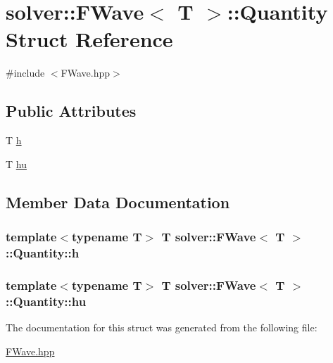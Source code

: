 \hypertarget{structsolver_1_1FWave_1_1Quantity}{}\section{solver\+:\+:F\+Wave$<$ T $>$\+:\+:Quantity Struct Reference}
\label{structsolver_1_1FWave_1_1Quantity}


{\ttfamily \#include $<$F\+Wave.\+hpp$>$}

\subsection*{Public Attributes}
\begin{DoxyCompactItemize}
\item 
T \hyperlink{structsolver_1_1FWave_1_1Quantity_ab21e966b42ed55a04b852deb96ec7285}{h}
\item 
T \hyperlink{structsolver_1_1FWave_1_1Quantity_a85b3d7be51ca5dc26a031d421c16095c}{hu}
\end{DoxyCompactItemize}


\subsection{Member Data Documentation}
\hypertarget{structsolver_1_1FWave_1_1Quantity_ab21e966b42ed55a04b852deb96ec7285}{}
\subsubsection[{h}]{\setlength{\rightskip}{0pt plus 5cm}template$<$typename T$>$ T {\bf solver\+::\+F\+Wave}$<$ T $>$\+::Quantity\+::h}\label{structsolver_1_1FWave_1_1Quantity_ab21e966b42ed55a04b852deb96ec7285}
\hypertarget{structsolver_1_1FWave_1_1Quantity_a85b3d7be51ca5dc26a031d421c16095c}{}
\subsubsection[{hu}]{\setlength{\rightskip}{0pt plus 5cm}template$<$typename T$>$ T {\bf solver\+::\+F\+Wave}$<$ T $>$\+::Quantity\+::hu}\label{structsolver_1_1FWave_1_1Quantity_a85b3d7be51ca5dc26a031d421c16095c}


The documentation for this struct was generated from the following file\+:\begin{DoxyCompactItemize}
\item 
\hyperlink{FWave_8hpp}{F\+Wave.\+hpp}\end{DoxyCompactItemize}
